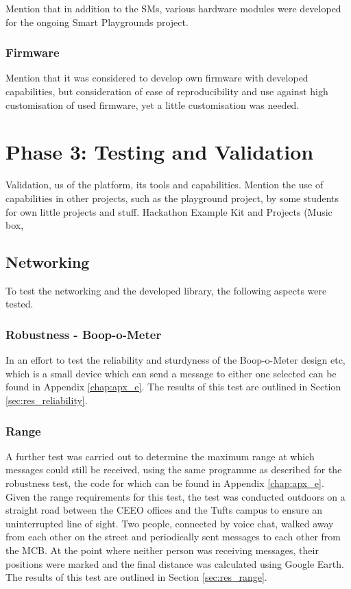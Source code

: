 Mention that in addition to the SMs, various hardware modules were developed for the ongoing Smart Playgrounds project.

\subsubsection{\label{sec:methods_fw}Firmware}
Mention that it was considered to develop own firmware with developed capabilities, but consideration of ease of reproducibility and use against high customisation of used firmware, yet a little customisation was needed.

\section{\label{sec:methods_ph3}Phase 3: Testing and Validation}
Validation, us of the platform, its tools and capabilities.
Mention the use of capabilities in other projects, such as the playground project, by some students for own little projects and stuff.
Hackathon
Example Kit and Projects (Music box, 

\subsection{\label{sec:methods_test_net}Networking}

To test the networking and the developed library, the following aspects were tested.

\subsubsection{\label{sec:methods_test_boop}Robustness - Boop-o-Meter}
In an effort to test the reliability and sturdyness of the 
Boop-o-Meter design etc, which is a small device which can send a message to either one selected
can be found in Appendix \ref{chap:apx_e}. The results of this test are outlined in Section \ref{sec:res_reliability}.

\subsubsection{\label{sec:methods_test_range}Range}
A further test was carried out to determine the maximum range at which messages could still be received, using the same programme as described for the robustness test, the code for which can be found in Appendix \ref{chap:apx_e}. Given the range requirements for this test, the test was conducted outdoors on a straight road between the CEEO offices and the Tufts campus to ensure an uninterrupted line of sight. 
Two people, connected by voice chat, walked away from each other on the street and periodically sent messages to each other from the MCB. At the point where neither person was receiving messages, their positions were marked and the final distance was calculated using Google Earth. The results of this test are outlined in Section \ref{sec:res_range}.

